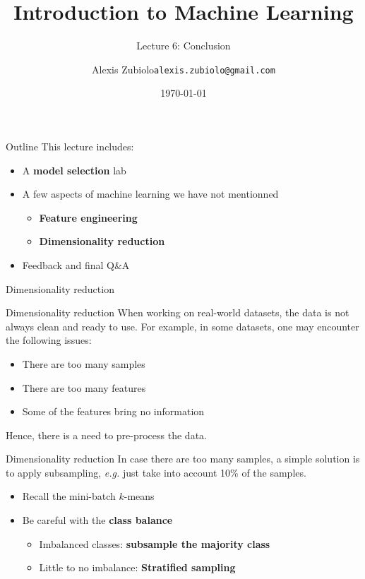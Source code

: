 \documentclass{beamer}
\title[Classification]{Introduction to Machine Learning}
\subtitle{Lecture 6: Conclusion}
\author{Alexis Zubiolo\newline\texttt{alexis.zubiolo@gmail.com}}
\institute{Data Science Team Lead @ Adcash}
\date{\today}
\newcommand{\1}[1]{\mathbbm{1}\left[#1\right]}
\begin{document}
\begin{frame}
  \titlepage
\end{frame}

\begin{frame}{Outline}
This lecture includes:
\begin{itemize}
 \item A \textbf{model selection} lab
 \item A few aspects of machine learning we have not mentionned
 \begin{itemize}
 	\item \textbf{Feature engineering}
 	\item \textbf{Dimensionality reduction}
 \end{itemize}
 \item Feedback and final Q\&A
\end{itemize}
\end{frame}


\begin{frame}
\begin{center}
\Huge{Dimensionality reduction}
\end{center}
\end{frame}

\begin{frame}{Dimensionality reduction}
When working on real-world datasets, the data is not always clean and ready to use.
\vfill
\pause
For example, in some datasets, one may encounter the following issues:
\begin{itemize}
	\item There are too many samples
	\item There are too many features
	\item Some of the features bring no information
\end{itemize}
\vfill
\pause
Hence, there is a need to pre-process the data.
\end{frame}

\begin{frame}{Dimensionality reduction}
In case there are too many samples, a simple solution is to apply subsampling, \textit{e.g.} just take into account 10\% of the samples.
\begin{itemize}
	\item Recall the mini-batch $k$-means
	\item Be careful with the \textbf{class balance}
	\begin{itemize}
		\item Imbalanced classes: \textbf{subsample the majority class}
		\item Little to no imbalance: \textbf{Stratified sampling}
	\end{itemize}
\end{itemize}
\end{frame}
\end{document}
